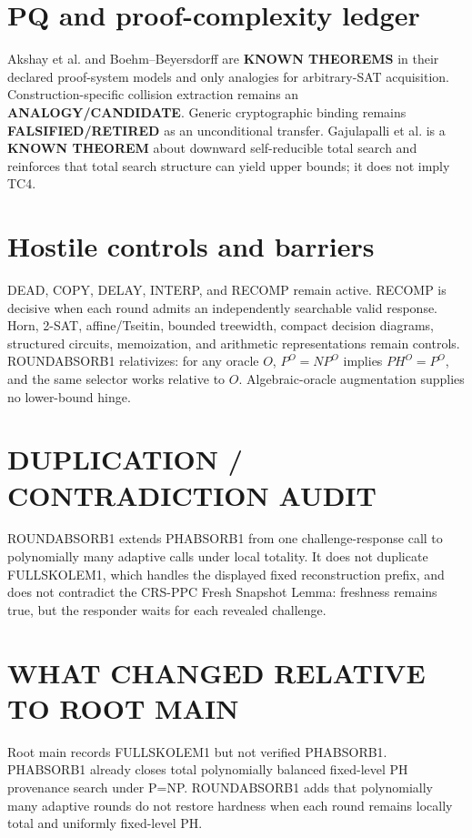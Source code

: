 \documentclass[11pt]{article}
\begin{document}
\section*{PQ and proof-complexity ledger}
Akshay et al. and Boehm--Beyersdorff are \textbf{KNOWN THEOREMS} in their declared proof-system models and only analogies for arbitrary-SAT acquisition. Construction-specific collision extraction remains an \textbf{ANALOGY/CANDIDATE}. Generic cryptographic binding remains \textbf{FALSIFIED/RETIRED} as an unconditional transfer. Gajulapalli et al. is a \textbf{KNOWN THEOREM} about downward self-reducible total search and reinforces that total search structure can yield upper bounds; it does not imply TC4.

\section*{Hostile controls and barriers}
DEAD, COPY, DELAY, INTERP, and RECOMP remain active. RECOMP is decisive when each round admits an independently searchable valid response. Horn, 2-SAT, affine/Tseitin, bounded treewidth, compact decision diagrams, structured circuits, memoization, and arithmetic representations remain controls. ROUNDABSORB1 relativizes: for any oracle $O$, $P^O=NP^O$ implies $PH^O=P^O$, and the same selector works relative to $O$. Algebraic-oracle augmentation supplies no lower-bound hinge.

\section*{DUPLICATION / CONTRADICTION AUDIT}
ROUNDABSORB1 extends PHABSORB1 from one challenge-response call to polynomially many adaptive calls under local totality. It does not duplicate FULLSKOLEM1, which handles the displayed fixed reconstruction prefix, and does not contradict the CRS-PPC Fresh Snapshot Lemma: freshness remains true, but the responder waits for each revealed challenge.

\section*{WHAT CHANGED RELATIVE TO ROOT MAIN}
Root main records FULLSKOLEM1 but not verified PHABSORB1. PHABSORB1 already closes total polynomially balanced fixed-level PH provenance search under P=NP. ROUNDABSORB1 adds that polynomially many adaptive rounds do not restore hardness when each round remains locally total and uniformly fixed-level PH.
\end{document}
